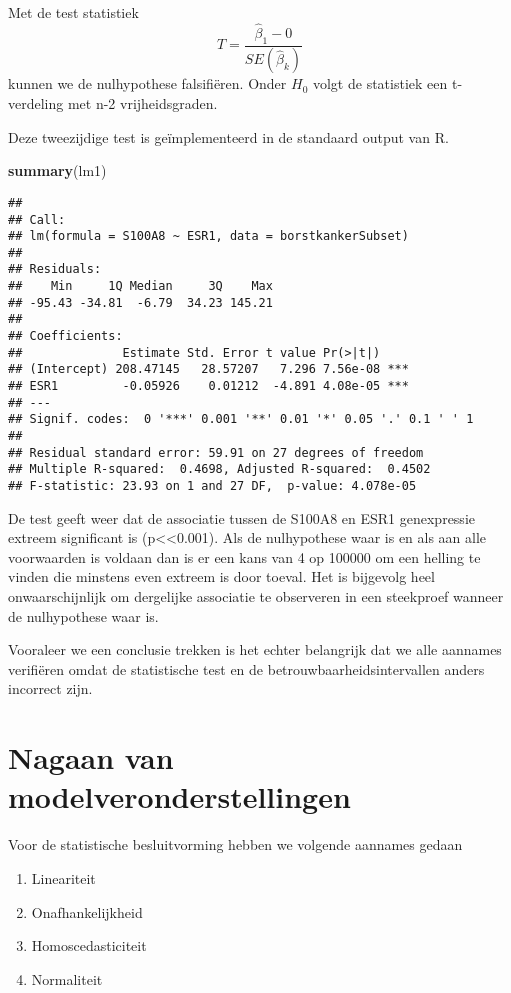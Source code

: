 \documentclass[12pt,dutch,coursenotes]{book}
\newenvironment{Shaded}{\begin{snugshade}}{\end{snugshade}}
\newcommand{\KeywordTok}[1]{\textcolor[rgb]{0.13,0.29,0.53}{\textbf{#1}}}
\newcommand{\NormalTok}[1]{#1}
\providecommand{\tightlist}{%
  \setlength{\itemsep}{0pt}\setlength{\parskip}{0pt}}
\theoremstyle{definition}
\theoremstyle{definition}
\theoremstyle{definition}
\theoremstyle{remark}
\begin{document}
Met de test statistiek \[T=\frac{\hat{\beta}_1-0}{SE(\hat{\beta}_k)}\]
kunnen we de nulhypothese falsifiëren. Onder \(H_0\) volgt de statistiek
een t-verdeling met n-2 vrijheidsgraden.

Deze tweezijdige test is geïmplementeerd in de standaard output van R.

\begin{Shaded}
\begin{Highlighting}[]
\KeywordTok{summary}\NormalTok{(lm1)}
\end{Highlighting}
\end{Shaded}

\begin{verbatim}
## 
## Call:
## lm(formula = S100A8 ~ ESR1, data = borstkankerSubset)
## 
## Residuals:
##    Min     1Q Median     3Q    Max 
## -95.43 -34.81  -6.79  34.23 145.21 
## 
## Coefficients:
##              Estimate Std. Error t value Pr(>|t|)    
## (Intercept) 208.47145   28.57207   7.296 7.56e-08 ***
## ESR1         -0.05926    0.01212  -4.891 4.08e-05 ***
## ---
## Signif. codes:  0 '***' 0.001 '**' 0.01 '*' 0.05 '.' 0.1 ' ' 1
## 
## Residual standard error: 59.91 on 27 degrees of freedom
## Multiple R-squared:  0.4698, Adjusted R-squared:  0.4502 
## F-statistic: 23.93 on 1 and 27 DF,  p-value: 4.078e-05
\end{verbatim}

De test geeft weer dat de associatie tussen de S100A8 en ESR1
genexpressie extreem significant is (p\textless{}\textless{}0.001). Als
de nulhypothese waar is en als aan alle voorwaarden is voldaan dan is er
een kans van 4 op 100000 om een helling te vinden die minstens even
extreem is door toeval. Het is bijgevolg heel onwaarschijnlijk om
dergelijke associatie te observeren in een steekproef wanneer de
nulhypothese waar is.

Vooraleer we een conclusie trekken is het echter belangrijk dat we alle
aannames verifiëren omdat de statistische test en de
betrouwbaarheidsintervallen anders incorrect zijn.

\section{Nagaan van
modelveronderstellingen}\label{nagaan-van-modelveronderstellingen}

Voor de statistische besluitvorming hebben we volgende aannames gedaan

\begin{enumerate}
\def\labelenumi{\arabic{enumi}.}
\tightlist
\item
  Lineariteit
\item
  Onafhankelijkheid\\
\item
  Homoscedasticiteit
\item
  Normaliteit
\end{enumerate}
\end{document}
